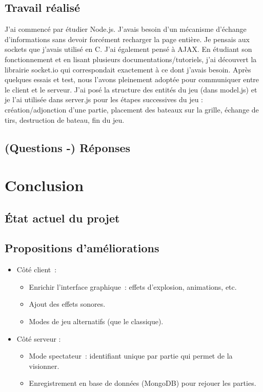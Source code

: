 \documentclass[a4paper, 11pt]{article}
\begin{document}
\subsection{Travail réalisé}
J'ai commencé par étudier Node.js. J'avais besoin d'un mécanisme d'échange d'informations sans devoir forcément recharger la page entière. Je pensais aux sockets que j'avais utilisé en C. J'ai également pensé à AJAX. En étudiant son fonctionnement et en lisant plusieurs documentations/tutoriels, j'ai découvert la librairie socket.io qui correspondait exactement à ce dont j'avais besoin. Après quelques essais et test, nous l'avons pleinement adoptée pour communiquer entre le client et le serveur. J'ai posé la structure des entités du jeu (dans model.js) et je l'ai utilisée dans server.js pour les étapes successives du jeu : création/adjonction d'une partie, placement des bateaux sur la grille, échange de tirs, destruction de bateau, fin du jeu.

\subsection{(Questions -) Réponses}

\section{Conclusion}
\subsection{État actuel du projet}
\subsection{Propositions d'améliorations}
\begin{itemize}
	\item Côté client :
	\begin{itemize}
		\item Enrichir l’interface graphique : effets d’explosion, animations, etc.
		\item Ajout des effets sonores.
		\item Modes de jeu alternatifs (que le classique).
	\end{itemize}
	\item Côté serveur :
	\begin{itemize}
		\item Mode spectateur : identifiant unique par partie qui permet de la visionner.
		\item Enregistrement en base de données (MongoDB) pour rejouer les parties.
	\end{itemize}
\end{itemize}
\end{document}
